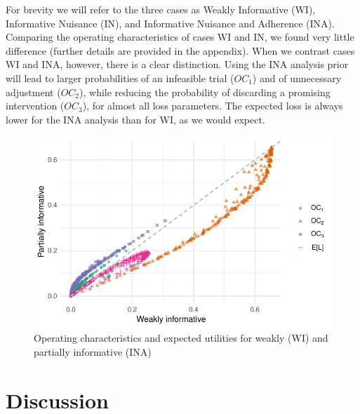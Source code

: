 \documentclass[AMA,STIX1COL]{WileyNJD-v2}
\begin{document}
For brevity we will refer to the three cases as Weakly Informative (WI), Informative Nuisance (IN), and Informative Nuisance and Adherence (INA). Comparing the operating characteristics of cases WI and IN, we found very little difference (further details are provided in the appendix). When we contrast cases WI and INA, however, there is a clear distinction. Using the INA analysis prior will lead to larger probabilities of an infeasible trial ($OC_1$) and of unnecessary adjustment ($OC_2$), while reducing the probability of discarding a promising intervention ($OC_3$), for almost all loss parameters. The expected loss is always lower for the INA analysis than for WI, as we would expect.


\begin{figure}
\centering
\includegraphics[scale=0.8]{./figures/an_prior_comp}
\caption{Operating characteristics and expected utilities for weakly (WI) and partially informative (INA)}
\label{fig:an_prior_comp}
\end{figure}

\section{Discussion}\label{sec:discussion}

\end{document}
